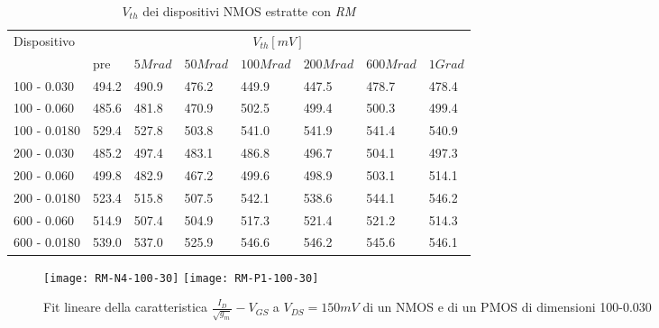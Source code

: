 \begin{table}[H]
  \renewcommand{\arraystretch}{1.3}
  \begin{tabular}{m{2.1cm} m{0.8cm} m{1.1cm} m{1.3cm} m{1.5cm} m{1.5cm} m{1.5cm} m{1cm}}
    \toprule
    \multirow{2}{*}{Dispositivo} & \multicolumn{7}{c}{$V_{th} [mV] $}                                                                    \\
    \cmidrule{2-8}
                                 & pre                                & $5Mrad$ & $50Mrad$ & $100Mrad$ & $200Mrad$ & $600Mrad$ & $1Grad$ \\
    \midrule
    100 - 0.030                     & 494.2                              & 490.9   & 476.2    & 449.9     & 447.5     & 478.7     & 478.4        \\
    \hline
    100 - 0.060                     & 485.6                              & 481.8   & 470.9    & 502.5     & 499.4     & 500.3     & 499.4        \\
    \hline
    100 - 0.0180                    & 529.4                              & 527.8   & 503.8    & 541.0     & 541.9     & 541.4     & 540.9        \\
    \hline
    200 - 0.030                     & 485.2                              & 497.4   & 483.1    & 486.8     & 496.7     & 504.1     & 497.3        \\
    \hline
    200 - 0.060                     & 499.8                              & 482.9   & 467.2    & 499.6     & 498.9     & 503.1     & 514.1        \\
    \hline
    200 - 0.0180                    & 523.4                              & 515.8   & 507.5    & 542.1     & 538.6     & 544.1     & 546.2        \\
    \hline
    600 - 0.060                     & 514.9                              & 507.4   & 504.9    & 517.3     & 521.4     & 521.2     & 514.3        \\
    \hline
    600 - 0.0180                    & 539.0                              & 537.0   & 525.9    & 546.6     & 546.2     & 545.6     & 546.1        \\
    \bottomrule
  \end{tabular}
  \caption{$V_{th}$ dei dispositivi NMOS estratte con \emph{RM}}
  \label{tab:VthRMN}
\end{table}

\begin{figure}[h!]
  \centering
  \texttt{[image: RM-N4-100-30]}
  \texttt{[image: RM-P1-100-30]}
  \caption{Fit lineare della caratteristica $\frac{I_D}{\sqrt{g_m}}-V_{GS}$ a $V_{DS}=150mV$ di un NMOS e di un PMOS di dimensioni 100-0.030}
\end{figure}

